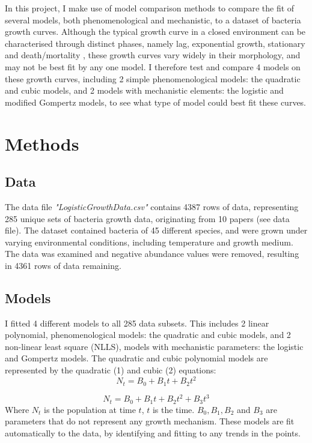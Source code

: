 \documentclass[11pt, letterpaper]{article}
\begin{document}
\noindent In this project, I make use of model comparison methods to compare the fit of several models, both phenomenological and mechanistic, to a dataset of bacteria growth curves. Although the typical growth curve in a closed environment can be characterised through distinct phases, namely lag, exponential growth, stationary and death/mortality \citep{peleg_microbial_2011}, these growth curves vary widely in their morphology, and may not be best fit by any one model. I therefore test and compare 4 models on these growth curves, including 2 simple phenomenological models: the quadratic and cubic models, and 2 models with mechanistic elements: the logistic and modified Gompertz models, to see what type of model could best fit these curves.


\section{Methods} %
\subsection{Data}
The data file \textit{"LogisticGrowthData.csv"} contains 4387 rows of data, representing 285 unique sets of bacteria growth data, originating from 10 papers (see data file). The dataset contained bacteria of 45 different species, and were grown under varying environmental conditions, including temperature and growth medium. The data was examined and negative abundance values were removed, resulting in 4361 rows of data remaining.

\subsection{Models}
I fitted 4 different models to all 285 data subsets. This includes 2 linear polynomial, phenomenological models: the quadratic and cubic models, and 2 non-linear least square (NLLS), models with mechanistic parameters: the logistic and Gompertz models. The quadratic and cubic polynomial models are represented by the quadratic (1) and cubic (2) equations:
\[
    N_t = B_0 + B_1t + B_2t^2 \tag{1}
\]

\[
    N_t = B_0 + B_1t + B_2t^2 + B_3t^3 \tag{2}
\]
Where \(N_t\) is the population at time \(t\), \(t\) is the time. \(B_0, B_1, B_2\) and \(B_3\) are parameters that do not represent any growth mechanism. These models are fit automatically to the data, by identifying and fitting to any trends in the points.\\
\end{document}
